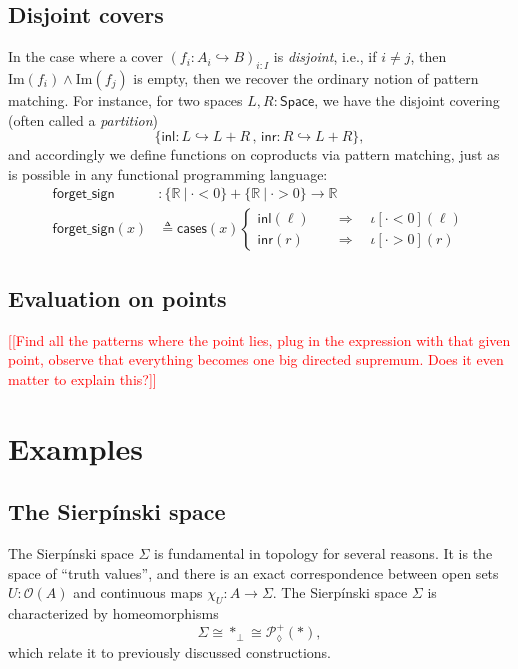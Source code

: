 \documentclass[conference]{IEEEtran}
\newcommand{\Space}{\mathsf{Space}}
\newcommand{\PLower}{\mathcal{P}_\lozenge}
\newcommand{\hookto}{\hookrightarrow}
\newcommand{\R}{\mathbb{R}}
\newcommand{\suchthat}{\ |\ }
\newcommand{\One}{\ast}
\newcommand{\Open}[1]{\mathcal{O}({#1})}
\newcommand{\Img}[1]{\text{Im}\left({#1}\right)}
\newcommand{\oinclf}[1]{\iota[{#1}]}
\newcommand{\oincl}[2]{\oinclf{#1} \left({#2}\right)}
\newcommand{\Branch}{\Rightarrow}
\newcommand{\note}[1]{\textcolor{red}{[[{#1}]]}}
\begin{document}
\subsection{Disjoint covers}

In the case where a cover $\left( f_i : A_i \hookto B \right)_{i : I}$ is \emph{disjoint}, i.e., if $i \ne j$, then $\Img{f_i} \wedge \Img{f_j}$ is empty, then we recover the ordinary notion of pattern matching. For instance, for two spaces $L, R : \Space$, we have the disjoint covering (often called a \emph{partition})
\[
\{ \mathsf{inl} : L \hookto L + R \,,\, \mathsf{inr} : R \hookto L + R \},
\]
and accordingly we define functions on coproducts via pattern matching, just as is possible in any functional programming language:
\begin{align*}
\mathsf{forget\_sign} &: \{ \R \suchthat \cdot < 0 \} + \{ \R \suchthat \cdot > 0 \} \to \R
\\ \mathsf{forget\_sign}(x) &\triangleq
  \mathsf{cases}(x)
  \begin{cases}
  \mathsf{inl}(\ell) \quad &\Branch \quad \oincl{\cdot < 0}{\ell}
  \\ \mathsf{inr}(r) \quad &\Branch \quad \oincl{\cdot > 0}{r}
  \end{cases}
\end{align*}


\subsection{Evaluation on points}

\note{Find all the patterns where the point lies, plug in the expression with that given point, observe that everything becomes one big directed supremum. Does it even matter to explain this?}

\section{Examples}

\subsection{The Sierp\'inski space}

The Sierp\'inski space $\Sigma$ is fundamental in topology for several reasons. It is the space of ``truth values'', and there is an exact correspondence between open sets $U : \Open{A}$ and continuous maps $\chi_U : A \to \Sigma$. The Sierp\'inski space $\Sigma$ is characterized by homeomorphisms
\[
\Sigma \cong \One_\bot \cong \PLower^+(\One) ,
\]
which relate it to previously discussed constructions.
\end{document}
